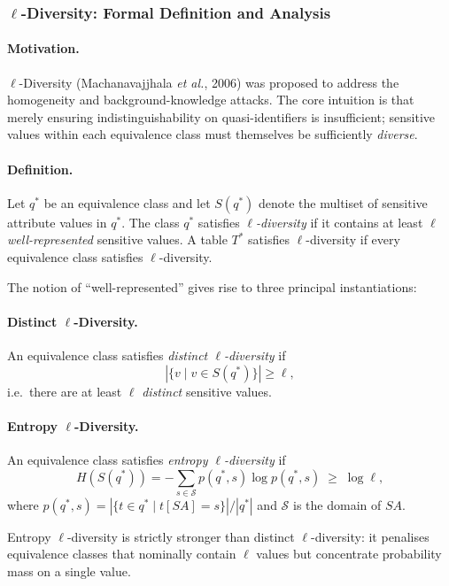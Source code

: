 \subsubsection{$\ell$-Diversity: Formal Definition and Analysis}
\label{sec:ldiv_formal}

\paragraph{Motivation.}
$\ell$-Diversity (Machanavajjhala \emph{et al.}, 2006) \cite{machanavajjhala2007} was proposed to address the homogeneity and background-knowledge attacks. The core intuition is that merely ensuring indistinguishability on quasi-identifiers is insufficient; sensitive values within each equivalence class must themselves be sufficiently \emph{diverse}.

\paragraph{Definition.}
Let $q^*$ be an equivalence class and let $S(q^*)$ denote the multiset of sensitive attribute values in $q^*$. The class $q^*$ satisfies \emph{$\ell$-diversity} if it contains at least $\ell$ \emph{well-represented} sensitive values. A table $T^*$ satisfies $\ell$-diversity if every equivalence class satisfies $\ell$-diversity.

The notion of ``well-represented'' gives rise to three principal instantiations:

\paragraph{Distinct $\ell$-Diversity.}
An equivalence class satisfies \emph{distinct $\ell$-diversity} if
\[
  |\{v \mid v \in S(q^*)\}| \geq \ell,
\]
i.e.\ there are at least $\ell$ \emph{distinct} sensitive values.

\paragraph{Entropy $\ell$-Diversity.}
An equivalence class satisfies \emph{entropy $\ell$-diversity} if
\[
  H(S(q^*)) = -\sum_{s \in \mathcal{S}} p(q^*, s)\log p(q^*, s) \;\geq\; \log\ell,
\]
where $p(q^*, s) = |\{t \in q^* \mid t[SA] = s\}| / |q^*|$ and $\mathcal{S}$ is the domain of $SA$.

Entropy $\ell$-diversity is strictly stronger than distinct $\ell$-diversity: it penalises equivalence classes that nominally contain $\ell$ values but concentrate probability mass on a single value.

